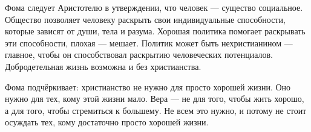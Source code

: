 Фома следует Аристотелю в утверждении, что человек --- существо социальное. Общество позволяет человеку раскрыть свои индивидуальные способности, которые зависят от души, тела и разума. Хорошая политика помогает раскрывать эти способности, плохая --- мешает. Политик может быть нехристианином --- главное, чтобы он способствовал раскрытию человеческих потенциалов. Добродетельная жизнь возможна и без христианства.

Фома подчёркивает: христианство не нужно для просто хорошей жизни. Оно нужно для тех, кому этой жизни мало. Вера --- не для того, чтобы жить хорошо, а для того, чтобы стремиться к большему. Не всем это нужно, и потому не стоит осуждать тех, кому достаточно просто хорошей жизни.



